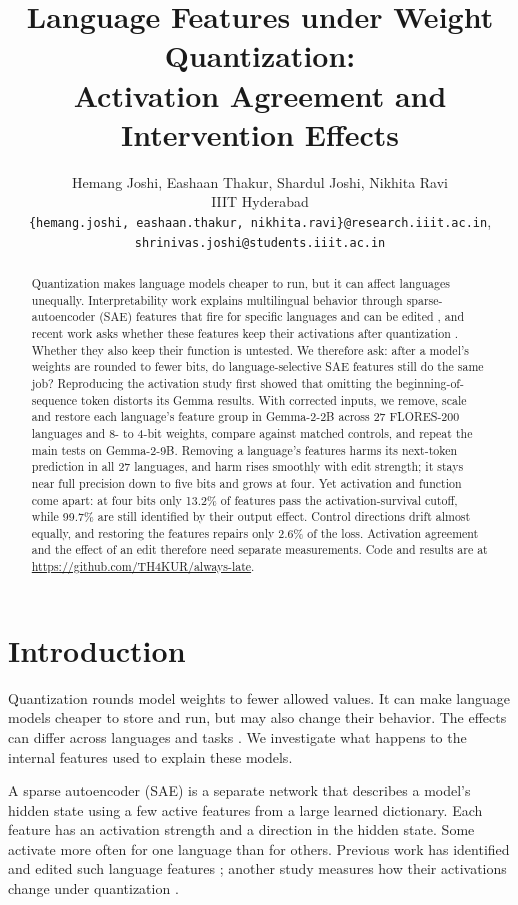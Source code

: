 \documentclass[11pt]{article}
\title{Language Features under Weight Quantization:\\Activation Agreement and Intervention Effects}
\author{
Hemang Joshi, Eashaan Thakur, Shardul Joshi, Nikhita Ravi \\
IIIT Hyderabad \\
\texttt{\{hemang.joshi, eashaan.thakur, nikhita.ravi\}@research.iiit.ac.in}, \\
\texttt{shrinivas.joshi@students.iiit.ac.in}
}
\begin{document}
\maketitle
\begin{abstract}
Quantization makes language models cheaper to run, but it can affect languages unequally. Interpretability work explains multilingual behavior through sparse-autoencoder (SAE) features that fire for specific languages and can be edited \citep{deng-etal-2025-unveiling}, and recent work asks whether these features keep their activations after quantization \citep{duan2026}. Whether they also keep their function is untested. We therefore ask: after a model's weights are rounded to fewer bits, do language-selective SAE features still do the same job? Reproducing the activation study first showed that omitting the beginning-of-sequence token distorts its Gemma results. With corrected inputs, we remove, scale and restore each language's feature group in Gemma-2-2B across 27 FLORES-200 languages and 8- to 4-bit weights, compare against matched controls, and repeat the main tests on Gemma-2-9B. Removing a language's features harms its next-token prediction in all 27 languages, and harm rises smoothly with edit strength; it stays near full precision down to five bits and grows at four. Yet activation and function come apart: at four bits only 13.2\% of features pass the activation-survival cutoff, while 99.7\% are still identified by their output effect. Control directions drift almost equally, and restoring the features repairs only 2.6\% of the loss. Activation agreement and the effect of an edit therefore need separate measurements. Code and results are at \url{https://github.com/TH4KUR/always-late}.
\end{abstract}

\section{Introduction}
Quantization rounds model weights to fewer allowed values. It can make language models cheaper to store and run, but may also change their behavior. The effects can differ across languages and tasks \citep{marchisio-etal-2024-quantization}. We investigate what happens to the internal features used to explain these models.

A sparse autoencoder (SAE) is a separate network that describes a model's hidden state using a few active features from a large learned dictionary. Each feature has an activation strength and a direction in the hidden state. Some activate more often for one language than for others. Previous work has identified and edited such language features \citep{deng-etal-2025-unveiling}; another study measures how their activations change under quantization \citep{duan2026}.
\end{document}
